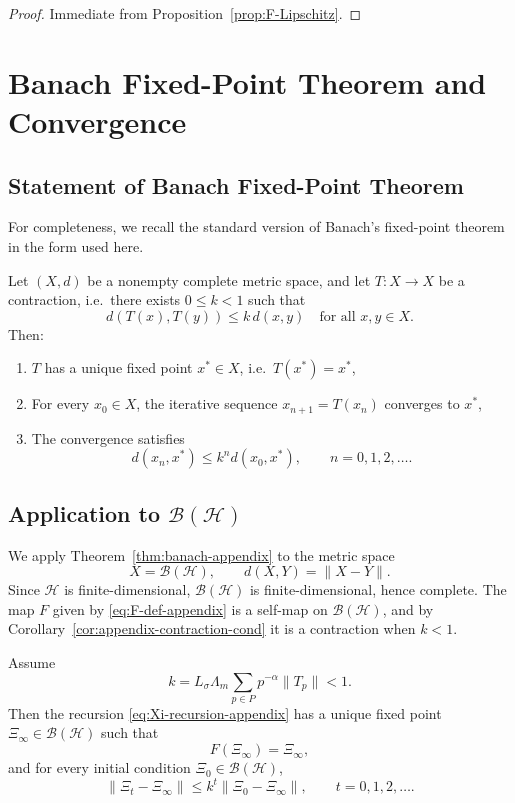\documentclass[12pt]{article}
\begin{document}
\begin{proof}
Immediate from Proposition~\ref{prop:F-Lipschitz}.
\end{proof}

\section{Banach Fixed-Point Theorem and Convergence}
\label{sec:appendix-banach}

\subsection{Statement of Banach Fixed-Point Theorem}

For completeness, we recall the standard version of Banach's fixed-point theorem in the form used here.

\begin{theorem}
\label{thm:banach-appendix}
Let \((X,d)\) be a nonempty complete metric space, and let \(T:X\to X\) be a contraction, i.e.\ there exists \(0\le k <1\) such that
\[
  d(T(x),T(y)) \le k\,d(x,y)
  \quad \text{for all } x,y\in X.
\]
Then:
\begin{enumerate}
  \item \(T\) has a unique fixed point \(x^\ast\in X\), i.e.\ \(T(x^\ast)=x^\ast\),
  \item For every \(x_0\in X\), the iterative sequence \(x_{n+1}=T(x_n)\) converges to \(x^\ast\),
  \item The convergence satisfies
  \[
    d(x_n,x^\ast) \le k^n d(x_0,x^\ast), \qquad n=0,1,2,\dots.
  \]
\end{enumerate}
\end{theorem}

\subsection{Application to \(\mathcal{B}(\mathcal{H})\)}

We apply Theorem~\ref{thm:banach-appendix} to the metric space
\[
  X = \mathcal{B}(\mathcal{H}),\qquad
  d(X,Y) = \|X-Y\|.
\]
Since \(\mathcal{H}\) is finite-dimensional, \(\mathcal{B}(\mathcal{H})\) is finite-dimensional, hence complete. The map \(F\) given by \eqref{eq:F-def-appendix} is a self-map on \(\mathcal{B}(\mathcal{H})\), and by Corollary~\ref{cor:appendix-contraction-cond} it is a contraction when \(k<1\).

\begin{theorem}
\label{thm:appendix-convergence}
Assume
\[
  k = L_\sigma \Lambda_m \sum_{p\in P} p^{-\alpha}\|T_p\| < 1.
\]
Then the recursion \eqref{eq:Xi-recursion-appendix} has a unique fixed point \(\Xi_\infty\in\mathcal{B}(\mathcal{H})\) such that
\[
  F(\Xi_\infty) = \Xi_\infty,
\]
and for every initial condition \(\Xi_0\in\mathcal{B}(\mathcal{H})\),
\[
  \|\Xi_t - \Xi_\infty\| \le k^t \|\Xi_0 - \Xi_\infty\|,
  \qquad t=0,1,2,\dots.
\]
\end{theorem}
\end{document}
